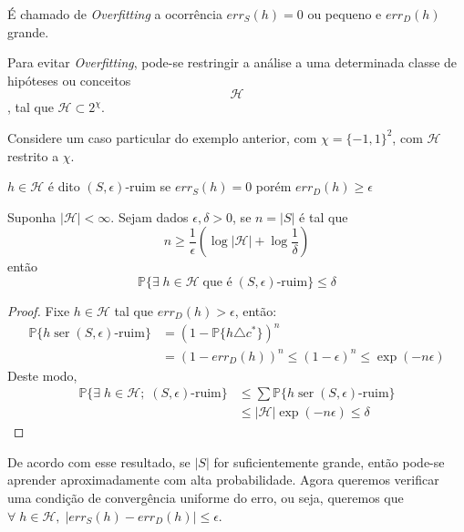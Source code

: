 \begin{definition}
É chamado de \emph{Overfitting} a ocorrência $err_S(h) = 0$ ou pequeno e $err_D(h)$ grande.
\end{definition}{}

Para evitar \emph{Overfitting}, pode-se restringir a análise a uma determinada classe de hipóteses ou conceitos $$\mathcal{H}$$, tal que $\mathcal{H} \subset 2^\chi$.

\begin{exemple}
Considere um caso particular do exemplo anterior, com $\chi = \{-1,1\}^2$, com $\mathcal{H}$ restrito a $\chi$.
\end{exemple}{}

\begin{definition}
$h \in \mathcal{H}$ é dito $(S, \epsilon)\text{-ruim}$ se $err_S(h) = 0$ porém $err_D(h) \geq \epsilon$
\end{definition}{}

\begin{theorem}
Suponha $|\mathcal{H}| < \infty$. Sejam dados  $\epsilon, \delta > 0$, se $n = |S|$ é tal que
\begin{equation*}
n \geq \frac{1}{\epsilon}\left(\log{|\mathcal{H}|} + \log{\frac{1}{\delta}}\right)
\end{equation*}{}
então
\begin{equation*}
    \mathbb{P} \{\exists \; h \in \mathcal{H} \; \text{que é} \; (S, \epsilon)\text{-ruim}\} \leq \delta
\end{equation*}{}
\end{theorem}

\begin{proof}
Fixe $h \in \mathcal{H}$ tal que $err_D(h) > \epsilon$, então:
\begin{align*}
    \mathbb{P}\{h \; \text{ser} \; (S, \epsilon)\text{-ruim}\} &= \left(1 - \mathbb{P}\{h \triangle c^*\}\right)^n \\
    &=(1 - err_D(h))^n \leq (1 - \epsilon)^n \leq \exp(-n\epsilon)
\end{align*}
Deste modo,
\begin{align*}
\mathbb{P}\{\exists \; h \in \mathcal{H}; \; (S, \epsilon)\text{-ruim}\} &\leq \sum{\mathbb{P}\{h \; \text{ser} \; (S, \epsilon)\text{-ruim}\}} \\
&\leq |\mathcal{H}|\exp(-n\epsilon) \leq \delta
\end{align*}
\end{proof}{}

De acordo com esse resultado, se $|S|$ for suficientemente grande, então pode-se aprender aproximadamente com alta probabilidade.
Agora queremos verificar uma condição de convergência uniforme do erro, ou seja, queremos que $\forall \; h \in \mathcal{H}, \; |err_S(h) - err_D(h)| \leq \epsilon$.

